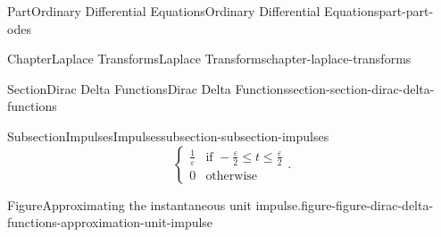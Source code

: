 \documentclass[twoside,10pt,]{book}
\numberwithin{equation}{part}
\newcommand{\amp}{&}
\begin{document}
\begin{partptx}{Part}{Ordinary Differential Equations}{}{Ordinary Differential Equations}{}{}{part-part-odes}
\begin{chapterptx}{Chapter}{Laplace Transforms}{}{Laplace Transforms}{}{}{chapter-laplace-transforms}
\begin{sectionptx}{Section}{Dirac Delta Functions}{}{Dirac Delta Functions}{}{}{section-section-dirac-delta-functions}
\begin{subsectionptx}{Subsection}{Impulses}{}{Impulses}{}{}{subsection-subsection-impulses}
\begin{equation*}
\begin{cases}
\frac{1}{\varepsilon} \amp\text{if }-\frac{\varepsilon}{2}\leq t\leq \frac{\varepsilon}{2} \\
0 \amp\text{otherwise}
\end{cases}.
\end{equation*}
%
\begin{figureptx}{Figure}{Approximating the instantaneous unit impulse.}{figure-figure-dirac-delta-functions-approximation-unit-impulse}{}%
\begin{image}{0.2}{0.6}{0.2}{}%
\end{image}
\end{figureptx}
\end{subsectionptx}
\end{sectionptx}
\end{chapterptx}
\end{partptx}
\end{document}
